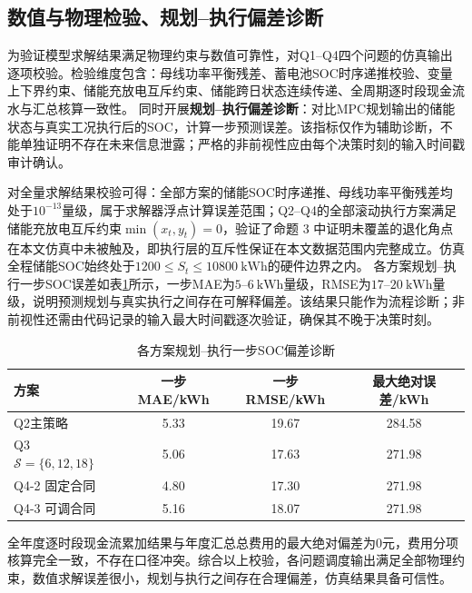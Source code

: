 
\subsection{数值与物理检验、规划--执行偏差诊断}
为验证模型求解结果满足物理约束与数值可靠性，对Q1--Q4四个问题的仿真输出逐项校验。检验维度包含：母线功率平衡残差、蓄电池SOC时序递推校验、变量上下界约束、储能充放电互斥约束、储能跨日状态连续传递、全周期逐时段现金流水与汇总核算一致性。
同时开展\textbf{规划--执行偏差诊断}：对比MPC规划输出的储能状态与真实工况执行后的SOC，计算一步预测误差。该指标仅作为辅助诊断，不能单独证明不存在未来信息泄露；严格的非前视性应由每个决策时刻的输入时间戳审计确认。

对全量求解结果校验可得：全部方案的储能SOC时序递推、母线功率平衡残差均处于$10^{-13}$量级，属于求解器浮点计算误差范围；Q2--Q4的全部滚动执行方案满足储能充放电互斥约束$\min(x_t,y_t)=0$，验证了命题 3 中证明未覆盖的退化角点在本文仿真中未被触及，即执行层的互斥性保证在本文数据范围内完整成立。仿真全程储能SOC始终处于$1200\le S_t\le10800\ \mathrm{kWh}$的硬件边界之内。
各方案规划--执行一步SOC误差如表\ref{tab:exec_diag}所示，一步MAE为$5$--$6\ \mathrm{kWh}$量级，RMSE为$17$--$20\ \mathrm{kWh}$量级，说明预测规划与真实执行之间存在可解释偏差。该结果只能作为流程诊断；非前视性还需由代码记录的输入最大时间戳逐次验证，确保其不晚于决策时刻。
\begin{table}[htbp]
\centering
\caption{各方案规划--执行一步SOC偏差诊断}
\label{tab:exec_diag}
\scriptsize
\begin{tabular}{lccc}
\toprule
方案 & 一步MAE/kWh & 一步RMSE/kWh & 最大绝对误差/kWh \\
\midrule
Q2主策略 & 5.33 & 19.67 & 284.58 \\
Q3 $\mathcal{S}=\{6,12,18\}$ & 5.06 & 17.63 & 271.98 \\
Q4-2 固定合同 & 4.80 & 17.30 & 271.98 \\
Q4-3 可调合同 & 5.16 & 18.07 & 271.98 \\
\bottomrule
\end{tabular}
\end{table}
全年度逐时段现金流累加结果与年度汇总总费用的最大绝对偏差为$0$元，费用分项核算完全一致，不存在口径冲突。综合以上校验，各问题调度输出满足全部物理约束，数值求解误差很小，规划与执行之间存在合理偏差，仿真结果具备可信性。

